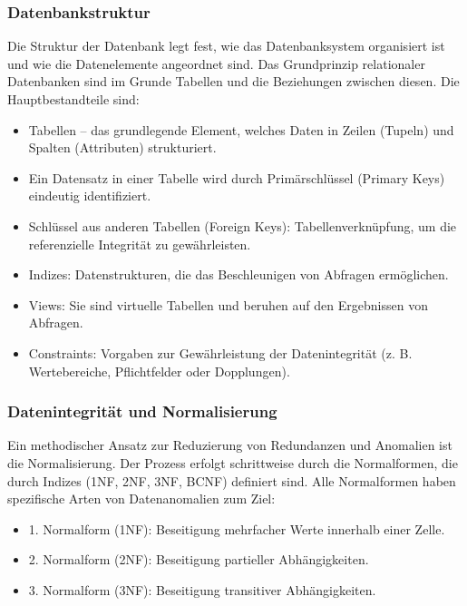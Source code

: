 \subsubsection{Datenbankstruktur}

Die Struktur der Datenbank legt fest, wie das Datenbanksystem organisiert ist und wie die Datenelemente angeordnet sind.
Das Grundprinzip relationaler Datenbanken sind im Grunde Tabellen und die Beziehungen zwischen diesen.
Die Hauptbestandteile sind: \cite*[35]{Gadatsch2019}

\begin{itemize}
\item Tabellen – das grundlegende Element, welches Daten in Zeilen (Tupeln) und Spalten (Attributen) strukturiert.
\item Ein Datensatz in einer Tabelle wird durch Primärschlüssel (Primary Keys) eindeutig identifiziert.
\item Schlüssel aus anderen Tabellen (Foreign Keys): Tabellenverknüpfung, um die referenzielle Integrität zu gewährleisten.
\item Indizes: Datenstrukturen, die das Beschleunigen von Abfragen ermöglichen.
\item Views: Sie sind virtuelle Tabellen und beruhen auf den Ergebnissen von Abfragen.
\item Constraints: Vorgaben zur Gewährleistung der Datenintegrität (z. B. Wertebereiche, Pflichtfelder oder Dopplungen).
\end{itemize}
\textit{%
}\subsubsection{Datenintegrität und Normalisierung}
\textit{%
}Ein methodischer Ansatz zur Reduzierung von Redundanzen und Anomalien ist die Normalisierung.
Der Prozess erfolgt schrittweise durch die Normalformen, die durch Indizes (1NF, 2NF, 3NF, BCNF) definiert sind.
Alle Normalformen haben spezifische Arten von Datenanomalien zum Ziel: \cite*[38-41]{Gadatsch2019}

\begin{itemize}

\item 1. Normalform (1NF): Beseitigung mehrfacher Werte innerhalb einer Zelle.
\item 2. Normalform (2NF): Beseitigung partieller Abhängigkeiten.
\item 3. Normalform (3NF): Beseitigung transitiver Abhängigkeiten.

\end{itemize}

